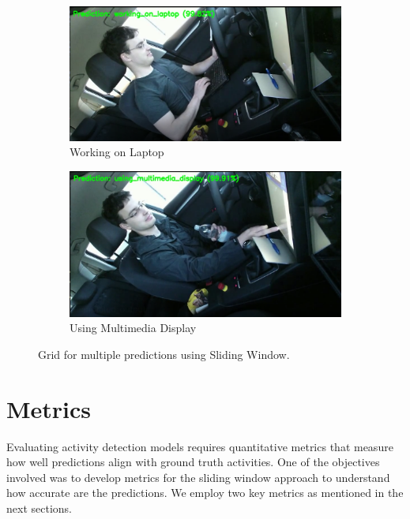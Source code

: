\documentclass{article}
\begin{document}
\begin{figure}[h]
    \begin{subfigure}{0.45\textwidth}
        \centering
        \includegraphics[width=\textwidth]{figs/DAR3.png}
        \caption{Working on Laptop}
    \end{subfigure}
    \hspace{0.5cm}
    \begin{subfigure}{0.45\textwidth}
        \centering
        \includegraphics[width=\textwidth]{figs/DAR4.png}
        \caption{Using Multimedia Display}
    \end{subfigure}

    \caption{Grid for multiple predictions using Sliding Window.}
    \label{fig:sliding-window-predictions}
\end{figure}

\section{Metrics}
Evaluating activity detection models requires quantitative metrics that measure how well predictions align with ground truth activities. One of the objectives involved was to develop metrics for the sliding window approach to understand how accurate are the predictions. We employ two key metrics as mentioned in the next sections.
\end{document}
